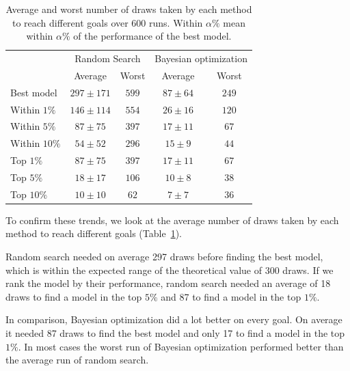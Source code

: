 \begin{table}[htb]
	\centering
	\begin{tabular}{ | l | c | c | c | c | }
		\hline
		 & \multicolumn{2}{|c|}{Random Search} & \multicolumn{2}{|c|}{Bayesian optimization} \\ 
		& Average & Worst & Average & Worst \\
		\hline
		Best model & $297 \pm 171$ & $599$ & $87 \pm 64$ & $249$ \\
		\hline
		Within $1 \%$ & $146 \pm 114$ & $554$ & $26 \pm 16$ & $120$ \\
		Within $5 \%$ & $87 \pm 75$ & $397$ & $17 \pm 11$ & $67$ \\
		Within $10 \%$ & $54 \pm 52$ & $296$ & $15 \pm 9$ & $44$ \\
		\hline
		Top $1 \%$ & $87 \pm 75$ & $397$ & $17 \pm 11$ & $67$ \\
		Top $5 \%$ & $18 \pm 17$ & $106$ & $10 \pm 8$ & $38$ \\
		Top $10 \%$ & $10 \pm 10$ & $62$ & $7 \pm 7$ & $36$ \\
		\hline
	\end{tabular}
	\caption{Average and worst number of draws taken by each method to reach different goals over 600 runs. Within $\alpha \%$ mean within $\alpha \%$ of the performance of the best model.}
	\label{table:search_average}
\end{table}

To confirm these trends, we look at the average number of draws taken by each method to reach different goals (Table~\ref{table:search_average}).

Random search needed on average 297 draws before finding the best model, which is within the expected range of the theoretical value of 300 draws. If we rank the model by their performance, random search needed an average of 18 draws to find a model in the top $5\%$ and 87 to find a model in the top $1\%$.

In comparison, Bayesian optimization did a lot better on every goal. On average it needed 87 draws to find the best model and only 17 to find a model in the top $1 \%$. In most cases the worst run of Bayesian optimization performed better than the average run of random search.

